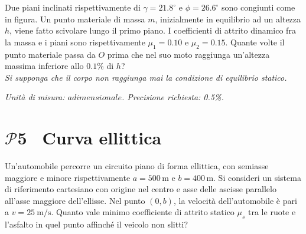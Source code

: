 \documentclass[a4paper,12pt]{article}
\newcommand{\problemtitle}[1]{
  \noindent
  \textbf{\Large #1}\hspace{0.5em}
  \raisebox{0.6ex}{\rule{\linewidth - \widthof{\textbf{\Large #1}} - 0.6em}{0.4pt}}%
}
\begin{document}
Due piani inclinati rispettivamente di $\gamma = 21.8 ^{\circ}$ e $\phi = 26.6 ^{\circ}$ sono congiunti come in figura. Un punto materiale di massa $m$, inizialmente in equilibrio ad un altezza $h$, viene fatto scivolare lungo il primo piano. I coefficienti di attrito dinamico fra la massa e i piani sono rispettivamente $\mu_1 = 0.10$ e $\mu_2 = 0.15$. Quante volte il punto materiale passa da $O$ prima che nel suo moto raggiunga un'altezza massima inferiore allo $0.1 \%$ di $h$? \\
\textit{Si supponga che il corpo non raggiunga mai la condizione di equilibrio statico.} \\

\begin{center}
\end{center}

\textit{Unità di misura: $adimensionale$. Precisione richiesta: 0.5\%.}





\section*{\problemtitle{$\mathcal{P}${\small{5}} \, Curva ellittica}}
Un'automobile percorre un circuito piano di forma ellittica, con semiasse maggiore e minore rispettivamente  \( a = 500\,\si{\meter} \) e \( b = 400\,\si{\meter} \). Si consideri un sistema di riferimento cartesiano con origine nel centro e asse delle ascisse parallelo all'asse maggiore dell'ellisse. Nel punto \( (0, b) \), la velocità dell’automobile è pari a \( v = \SI{25}{\meter\per\second} \). Quanto vale minimo coefficiente di attrito statico $\mu_s$ tra le ruote e l’asfalto in quel punto affinché il veicolo non slitti? \\
\end{document}
